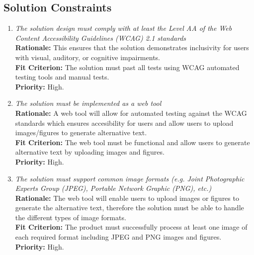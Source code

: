 \documentclass[12pt]{article}
\begin{document}
\subsection{Solution Constraints}
\begin{enumerate}[label=MD-SL \arabic*., wide=0pt, leftmargin=*]
  \item \emph{The solution design must comply with at least the Level
    AA of the Web Content Accessibility Guidelines (WCAG) 2.1 standards}\\[2mm]
    {\bf Rationale:} This ensures that the solution demonstrates
    inclusivity for users with visual, auditory, or cognitive impairments. \\
    {\bf Fit Criterion:} The solution must past all tests using WCAG
    automated testing tools and manual tests.\\
    {\bf Priority:} High.
  \item \emph{The solution must be implemented as a web tool}\\[2mm]
    {\bf Rationale:} A web tool will allow for automated testing
    against the WCAG standards which ensures accesibility for users
    and allow users to upload images/figures to generate alternative text.\\
    {\bf Fit Criterion:} The web tool must be functional and allow
    users to generate alternative text by uploading
    images and figures.\\
    {\bf Priority:} High.
  \item \emph{The solution must support common image formats (e.g.
        Joint Photographic Experts Group (JPEG), Portable Network Graphic
    (PNG), etc.)}\\[2mm]
    {\bf Rationale:} The web tool will enable users to upload images
    or figures to generate the alternative text, therefore the
    solution must be able
    to handle the different types of image formats.\\
    {\bf Fit Criterion:} The product must successfully process at
    least one image of each required format including JPEG and PNG
    images and figures.\\
    {\bf Priority:} High.
\end{enumerate}
\end{document}
